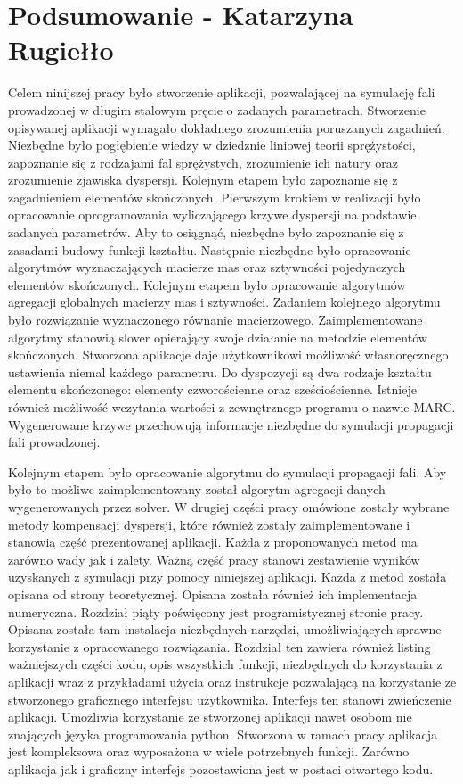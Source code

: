 \chapter{Podsumowanie - Katarzyna Rugiełło}
\label{cha:podsumowanie}

Celem ninijszej pracy było stworzenie aplikacji, pozwalającej na symulację fali prowadzonej w długim stalowym pręcie o zadanych parametrach. Stworzenie opisywanej aplikacji wymagało dokładnego zrozumienia poruszanych zagadnień. Niezbędne było pogłębienie wiedzy w dziedznie liniowej teorii sprężystości, zapoznanie się z rodzajami fal sprężystych, zrozumienie ich natury oraz zrozumienie zjawiska dyspersji. Kolejnym etapem było zapoznanie się z zagadnieniem elementów skończonych. Pierwszym krokiem w realizacji było opracowanie oprogramowania wyliczającego krzywe dyspersji na podstawie zadanych parametrów. Aby to osiągnąć, niezbędne było zapoznanie się z zasadami budowy funkcji kształtu. Następnie niezbędne było opracowanie algorytmów wyznaczających macierze mas oraz sztywności pojedynczych elementów skończonych. Kolejnym etapem było opracowanie algorytmów agregacji globalnych macierzy mas i sztywności. Zadaniem kolejnego algorytmu było rozwiązanie wyznaczonego równanie macierzowego. Zaimplementowane algorytmy stanowią slover opierający swoje działanie na metodzie elementów skończonych. Stworzona aplikacje daje użytkownikowi możliwość własnoręcznego ustawienia niemal każdego parametru. Do dyspozycji są dwa rodzaje kształtu elementu skończonego: elementy czworościenne oraz sześciościenne. Istnieje również możliwość wczytania wartości z zewnętrznego programu o nazwie MARC. Wygenerowane krzywe przechowują informacje niezbędne do symulacji propagacji fali prowadzonej. 

Kolejnym etapem było opracowanie algorytmu do symulacji propagacji fali. Aby było to możliwe zaimplementowany został algorytm agregacji danych wygenerowanych przez solver. W drugiej części pracy omówione zostały wybrane metody kompensacji dyspersji, które również zostały zaimplementowane i stanowią część prezentowanej aplikacji. Każda z proponowanych metod ma zarówno wady jak i zalety. Ważną część pracy stanowi zestawienie wyników uzyskanych z symulacji przy pomocy niniejszej aplikacji. Każda z metod została opisana od strony teoretycznej. Opisana została również ich implementacja numeryczna. Rozdział piąty poświęcony jest programistycznej stronie pracy. Opisana została tam instalacja niezbędnych narzędzi, umożliwiających sprawne korzystanie z opracowanego rozwiązania. Rozdział ten zawiera również listing ważniejszych części kodu, opis wszystkich funkcji, niezbędnych do korzystania z aplikacji wraz z przykładami użycia oraz instrukcje pozwalającą na korzystanie ze stworzonego graficznego interfejsu użytkownika. Interfejs ten stanowi zwieńczenie aplikacji. Umożliwia korzystanie ze stworzonej aplikacji nawet osobom nie znających języka programowania python. Stworzona w ramach pracy aplikacja jest kompleksowa oraz wyposażona w wiele potrzebnych funkcji. Zarówno aplikacja jak i graficzny interfejs pozostawiona jest w postaci otwartego kodu. 

